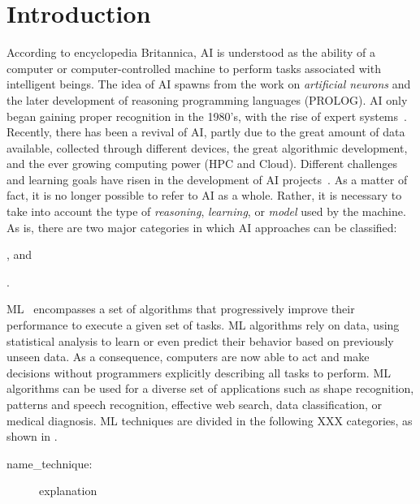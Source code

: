 
\section{Introduction}
\label{sec:introduction}

According to encyclopedia Britannica, \ac{AI} is understood as the ability of a computer or 
computer-controlled machine to perform tasks associated with intelligent beings. The idea of 
\ac{AI} spawns from the work on \textit{artificial neurons} and the later development of reasoning 
programming languages (\eg PROLOG). \ac{AI} only began gaining proper recognition in the 
1980's, with the rise of expert systems~\cite{russel09}.  Recently, there has been a revival of 
\ac{AI}, partly due to the great amount of data available, collected through different devices, the 
great algorithmic development, and the ever growing computing power (\ie \ac{HPC} and Cloud). 
Different challenges and learning goals have risen in the development of \ac{AI} 
projects~\cite{russel09}. As a matter of fact, it is no longer possible to refer to \ac{AI} as a whole. 
Rather, it is necessary to take into account the type of \emph{reasoning}, \emph{learning}, or 
\emph{model} used by the machine. As is, there are two major categories in which \ac{AI} 
approaches can be classified:
\begin{enumerate*}[label=(\arabic*)]
\item {}, and
\item .
\end{enumerate*}

\ac{ML}~\cite{mitchell97} encompasses a set of algorithms that progressively improve their 
performance to execute a given set of tasks. \ac{ML} algorithms rely on data, using statistical 
analysis to learn or even predict their behavior based on previously unseen data. As a consequence, 
computers are now able to act and make decisions without programmers explicitly describing all 
tasks to perform. \ac{ML} algorithms can be used for a diverse set of applications such as shape 
recognition, patterns and speech recognition, effective web search, data classification, or medical 
diagnosis. \ac{ML} techniques are divided in the following XXX categories, as shown in 
.
\begin{description}
  \item[name\_technique:] explanation 
\end{description}

